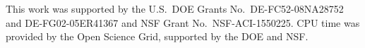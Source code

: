 \documentclass[3p,times,procedia]{elsarticle}
\begin{document}
This work was supported by the U.S.\ DOE Grants No.\ DE-FC52-08NA28752 and DE-FG02-05ER41367 and NSF Grant No.\ NSF-ACI-1550225. CPU time was provided by the Open Science Grid, supported by the DOE and NSF. 








%
%
%
\end{document}
